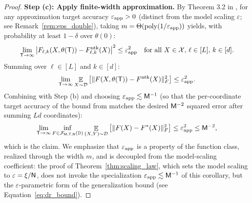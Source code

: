 \documentclass[11pt]{article}
\let\citet\citep
\theoremstyle{plain}
\DeclareMathOperator*{\E}{{\mathbb{E}}}
\DeclareMathOperator{\poly}{poly}
\begin{document}
\begin{proof}
    {\bf Step (c): Apply finite-width approximation.} By Theorem 3.2 in \citet{adh+19}, for any approximation target accuracy $\varepsilon_{\rm app} > 0$ (distinct from the model scaling $\varepsilon$; see Remark~\ref{rem:eps_double}), taking $m = \Theta(\poly(1/\varepsilon_{\rm app}))$ yields, with probability at least $1-\delta$ over $\theta(0)$:
    \begin{align*}
        \lim_{{\sf T} \rightarrow \infty}\left|F_{\ell, k}(X, \theta({\sf T})) - F_{\ell, k}^{\rm ntk}(X) \right|^2 \leq \varepsilon_{\rm app}^2 \quad \text{for all } X\in {\cal X},\, \ell\in[L],\, k\in[d].
    \end{align*}
    Summing over $\ell\in[L]$ and $k\in[d]$:
    \begin{align}\label{eq:approx_vareps}
        \lim_{{\sf T} \to \infty} \E_{X\sim {\cal D}}\big[ \| F(X, \theta({\sf T})) - F^{\rm ntk}(X) \|_F^2 \big] \leq \varepsilon_{\rm app}^2.
    \end{align}
    Combining with Step (b) and choosing $\varepsilon_{\rm app} \lesssim {\sf M}^{-1}$ (so that the per-coordinate target accuracy of the bound from \citet{adh+19} matches the desired ${\sf M}^{-2}$ squared error after summing $Ld$ coordinates):
    \begin{align*}
        \lim_{{\sf T} \to \infty} \inf_{F \in {\cal F}_{\sf M, T, N}(\mathbb{D})} \E_{(X, Y) \sim {\cal D}}\big[ \| F(X) - F^*(X)\|_F^2 \big] \leq \varepsilon_{\rm app}^2 \leq {\sf M}^{-2},
    \end{align*}
    which is the claim. We emphasize that $\varepsilon_{\rm app}$ is a property of the function class, realized through the width $m$, and is decoupled from the model-scaling coefficient: the proof of Theorem~\ref{thm:scaling_law}, which sets the model scaling to $\varepsilon = \xi/{\sf N}$, does not invoke the specialization $\varepsilon_{\rm app} \lesssim {\sf M}^{-1}$ of this corollary, but the $\varepsilon$-parametric form of the generalization bound (see Equation~\eqref{eq:dr_bound}).
\end{proof}
\end{document}
